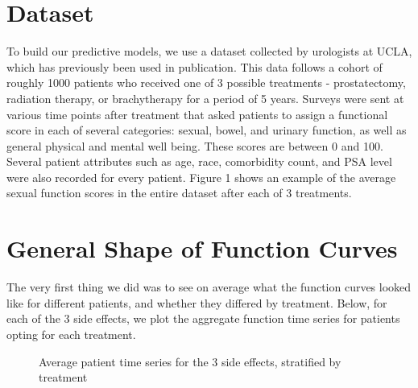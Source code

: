 
\section{Dataset}
To build our predictive models, we use a dataset collected by urologists at UCLA, which has previously been used in publication\cite{gore}.  This data follows a cohort of roughly 1000 patients who received one of 3 possible treatments - prostatectomy, radiation therapy, or brachytherapy for a period of 5 years.  Surveys were sent at various time points after treatment that asked patients to assign a functional score in each of several categories: sexual, bowel, and urinary function, as well as general physical and mental well being.  These scores are between 0 and 100.  Several patient attributes such as age, race, comorbidity count, and PSA level were also recorded for every patient.  Figure 1 shows an example of the average sexual function scores in the entire dataset after each of 3 treatments.

\section{General Shape of Function Curves}
The very first thing we did was to see on average what the function curves looked like for different patients, and whether they differed by treatment.  Below, for each of the 3 side effects, we plot the aggregate function time series for patients opting for each treatment.  

\begin{figure}
\centering
\begin{subfigure}[bowel function]{
  \texttt{[image: /Users/glareprotector/prostate\_git/glare/tex\_files/sections/explore/avg\_time\_series\_by\_treatment/bowel\_func.png]}}
\end{subfigure}
\begin{subfigure}[sexual function]{
  \texttt{[image: /Users/glareprotector/prostate\_git/glare/tex\_files/sections/explore/avg\_time\_series\_by\_treatment/sexual\_func.png]}}
\end{subfigure}
\begin{subfigure}[urinary function]{
  \texttt{[image: /Users/glareprotector/prostate\_git/glare/tex\_files/sections/explore/avg\_time\_series\_by\_treatment/urin\_func.png]}}
\end{subfigure}
\caption{Average patient time series for the 3 side effects, stratified by treatment}
\end{figure}

